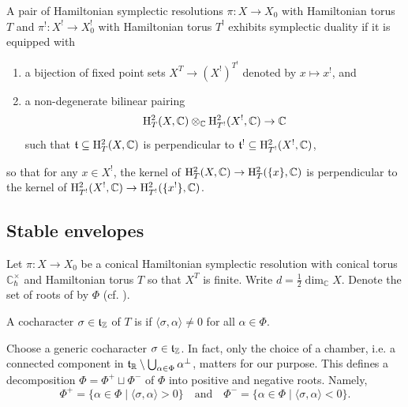 \begin{definition}{}
    A pair of Hamiltonian symplectic resolutions $\pi : X \to X_0$ with Hamiltonian torus $T$ and $\pi^! : X^! \to X_0^!$ with Hamiltonian torus $T^!$ exhibits symplectic duality if it is equipped with
    \begin{enumerate}
        \item a bijection of fixed point sets $X^T \to (X^!)^{T^!}$ denoted by $x \mapsto x^!$, and
        \item a non-degenerate bilinear pairing
        \begin{equation*}
            \mathrm{H}^2_T(X, \mathbb{C}) \otimes_\mathbb{C} \mathrm{H}^2_{T^!}(X^!, \mathbb{C}) \to \mathbb{C}
        \end{equation*}
        such that $\mathfrak{t} \subseteq \mathrm{H}^2_T(X, \mathbb{C})$ is perpendicular to $\mathfrak{t}^! \subseteq \mathrm{H}^2_{T^!}(X^!, \mathbb{C})$,
    \end{enumerate}
    so that for any $x \in X^!$, the kernel of $\mathrm{H}^2_T(X, \mathbb{C}) \to \mathrm{H}^2_T(\{x\}, \mathbb{C})$ is perpendicular to the kernel of $\mathrm{H}^2_{T^!}(X^!, \mathbb{C}) \to \mathrm{H}^2_{T^!}(\{x^!\}, \mathbb{C})$.
\end{definition}
\subsection{Stable envelopes}
\label{sec:stable_envelope}

Let $\pi : X \to X_0$ be a conical Hamiltonian symplectic resolution with conical torus $\mathbb{C}^\times_\hbar$ and Hamiltonian torus $T$ so that $X^T$ is finite. Write $d = \frac{1}{2} \dim_\mathbb{C} X$. Denote the set of roots of by $\Phi$ (cf. ).

\begin{definition}{}
    A cocharacter $\sigma \in \mathfrak{t}_\mathbb{Z}$ of $T$ is  if $\langle \sigma, \alpha \rangle \neq 0$ for all $\alpha \in \Phi$.
\end{definition}

Choose a generic cocharacter $\sigma \in \mathfrak{t}_\mathbb{Z}$. In fact, only the choice of a chamber, i.e. a connected component in $\mathfrak{t}_\mathbb{R} \setminus \bigcup_{\alpha \in \Phi} \alpha^\perp$, matters for our purpose. This defines a decomposition $\Phi = \Phi^+ \sqcup \Phi^-$ of $\Phi$ into positive and negative roots. Namely,
\begin{equation*}
    \Phi^+ = \{ \alpha \in \Phi \mid \langle \sigma, \alpha \rangle > 0 \} \quad \text{and} \quad \Phi^- = \{ \alpha \in \Phi \mid \langle \sigma, \alpha \rangle < 0 \}.
\end{equation*}

